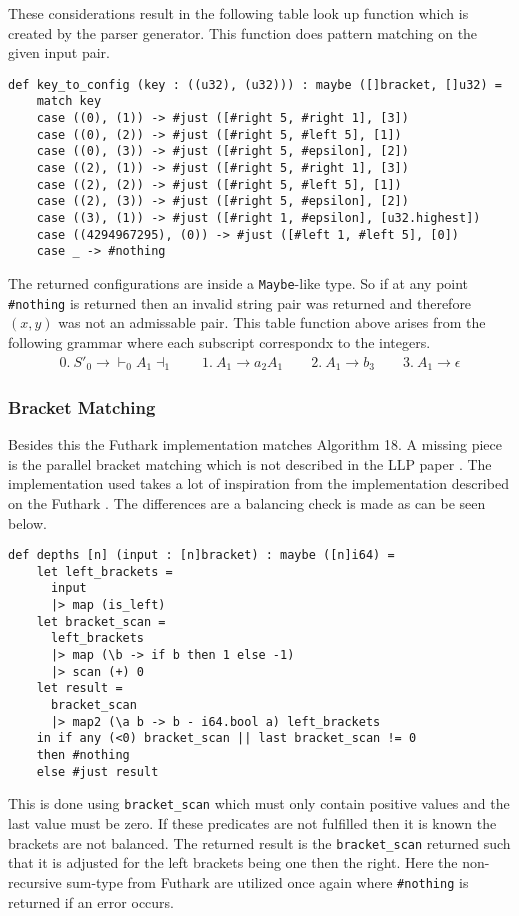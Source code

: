 These considerations result in the following table look up function which is created by the parser generator. This function does pattern matching on the given input pair.

\begin{lstlisting}[basicstyle=\ttfamily\scriptsize]
def key_to_config (key : ((u32), (u32))) : maybe ([]bracket, []u32) =
    match key
    case ((0), (1)) -> #just ([#right 5, #right 1], [3])
    case ((0), (2)) -> #just ([#right 5, #left 5], [1])
    case ((0), (3)) -> #just ([#right 5, #epsilon], [2])
    case ((2), (1)) -> #just ([#right 5, #right 1], [3])
    case ((2), (2)) -> #just ([#right 5, #left 5], [1])
    case ((2), (3)) -> #just ([#right 5, #epsilon], [2])
    case ((3), (1)) -> #just ([#right 1, #epsilon], [u32.highest])
    case ((4294967295), (0)) -> #just ([#left 1, #left 5], [0])
    case _ -> #nothing
\end{lstlisting}
The returned configurations are inside a \lstinline|Maybe|-like type. So if at any point \lstinline|#nothing| is returned then an invalid string pair was returned and therefore $(x,y)$ was not an admissable pair. This table function above arises from the following grammar where each subscript correspondx to the integers.
\begin{align*}
    0. \: S'_0 \to \vdash_0 A_1 \dashv_1 \qquad 1. \: A_1 \to a_2 A_1 \qquad 2. \: A_1 \to b_3 \qquad 3. \: A_1 \to \epsilon
\end{align*}

\subsubsection{Bracket Matching}
Besides this the Futhark implementation matches Algorithm 18. A missing piece is the parallel bracket matching which is not described in the LLP paper \cite[text]{Vagner2007}. The implementation used takes a lot of inspiration from the implementation described on the Futhark \cite{futhark:parens}. The differences are a balancing check is made as can be seen below.
\begin{lstlisting}[basicstyle=\ttfamily\scriptsize]
def depths [n] (input : [n]bracket) : maybe ([n]i64) =
    let left_brackets =
      input
      |> map (is_left)
    let bracket_scan =
      left_brackets
      |> map (\b -> if b then 1 else -1)
      |> scan (+) 0
    let result =
      bracket_scan
      |> map2 (\a b -> b - i64.bool a) left_brackets
    in if any (<0) bracket_scan || last bracket_scan != 0
    then #nothing
    else #just result
\end{lstlisting}
This is done using \lstinline|bracket_scan| which must only contain positive values and the last value must be zero. If these predicates are not fulfilled then it is known the brackets are not balanced. The returned result is the \lstinline|bracket_scan| returned such that it is adjusted for the left brackets being one then the right. Here the non-recursive sum-type from Futhark are utilized once again where \lstinline|#nothing| is returned if an error occurs.

